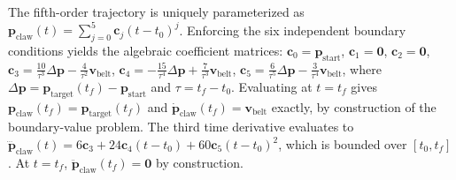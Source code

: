 \documentclass[journal]{IEEEtran}
\newenvironment{proof}{\begin{IEEEproof}}{\end{IEEEproof}}
\begin{document}
\begin{proof}
The fifth-order trajectory is uniquely parameterized as $\mathbf{p}_{\text{claw}}(t) = \sum_{j=0}^5 \mathbf{c}_j (t - t_0)^j$. Enforcing the six independent boundary conditions yields the algebraic coefficient matrices:
$\mathbf{c}_0 = \mathbf{p}_{\text{start}}$, $\mathbf{c}_1 = \mathbf{0}$, $\mathbf{c}_2 = \mathbf{0}$,
$\mathbf{c}_3 = \frac{10}{\tau^3} \Delta\mathbf{p} - \frac{4}{\tau^2} \mathbf{v}_{\text{belt}}$,
$\mathbf{c}_4 = -\frac{15}{\tau^4} \Delta\mathbf{p} + \frac{7}{\tau^3} \mathbf{v}_{\text{belt}}$,
$\mathbf{c}_5 = \frac{6}{\tau^5} \Delta\mathbf{p} - \frac{3}{\tau^4} \mathbf{v}_{\text{belt}}$,
where $\Delta\mathbf{p} = \mathbf{p}_{\text{target}}(t_f) - \mathbf{p}_{\text{start}}$ and $\tau = t_f-t_0$. Evaluating at $t = t_f$ gives $\mathbf{p}_{\text{claw}}(t_f) = \mathbf{p}_{\text{target}}(t_f)$ and $\dot{\mathbf{p}}_{\text{claw}}(t_f) = \mathbf{v}_{\text{belt}}$ exactly, by construction of the boundary-value problem. The third time derivative evaluates to $\dddot{\mathbf{p}}_{\text{claw}}(t) = 6\mathbf{c}_3 + 24\mathbf{c}_4(t - t_0) + 60\mathbf{c}_5(t - t_0)^2$, which is bounded over $[t_0, t_f]$. At $t=t_f$, $\ddot{\mathbf{p}}_{\text{claw}}(t_f) = \mathbf{0}$ by construction.
\end{proof}
\end{document}
